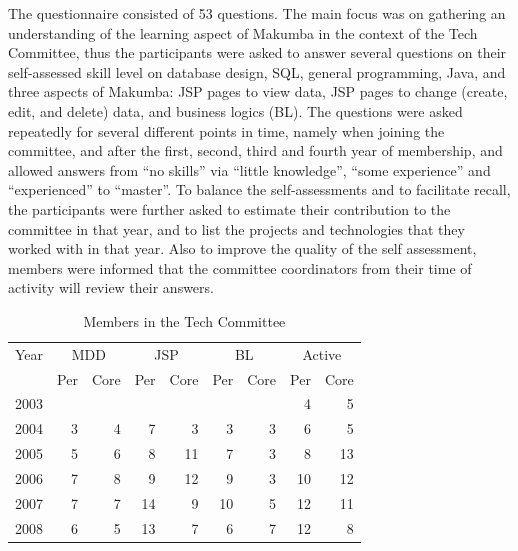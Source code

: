\documentclass{llncs}
\begin{document}
The questionnaire consisted of 53 questions. The main focus was on gathering an understanding of the learning aspect of Makumba in the context of the Tech Committee, thus the participants were asked to answer several questions on their self-assessed skill level on database design, SQL, general programming, Java, and three aspects of Makumba: JSP pages to view data, JSP pages to change (create, edit, and delete) data, and business logics (BL). The questions were asked repeatedly for several different points in time, namely when joining the committee, and after the first, second, third and fourth year of membership, and allowed answers from ``no skills'' via ``little knowledge'', ``some experience'' and ``experienced'' to ``master''. To balance the self-assessments and to facilitate recall, the participants were further asked to estimate their contribution to the committee in that year, and to list the projects and technologies that they worked with in that year. Also to improve the quality of the self assessment, members were informed that the committee coordinators from their time of activity will review their answers.


\begin{table}[t]
	\centering
	\begin{tabular}{c|r|r|r|r|r|r|r|r|}
		\hline
		\hline
		Year 		& \multicolumn{2}{c|}{MDD} & \multicolumn{2}{c|}{JSP}	& \multicolumn{2}{c|}{BL}	& \multicolumn{2}{c|}{Active}	\\
					& Per & Core				& Per & Core				& Per & Core				& Per & Core	\\
		\hline
		\hline
		2003 &   &   &   &   &   &   & 4 & 5 \\
		\hline
		2004 & 3 & 4 & 7 & 3 & 3 & 3 & 6 & 5 \\
		\hline
		2005 & 5 & 6 & 8 & 11 & 7 & 3 & 8 & 13 \\
		\hline
		2006 & 7 & 8 & 9 & 12 & 9 & 3 & 10 & 12 \\
		\hline
		2007 & 7 & 7 & 14 & 9 & 10 & 5 & 12 & 11 \\
		\hline
		2008 & 6 & 5 & 13 & 7 & 6 & 7 & 12 & 8 \\
		\hline
		\hline
	\end{tabular}
	\caption{Members in the Tech Committee}
	\label{tab:itd-members}
\end{table} 
\end{document}
